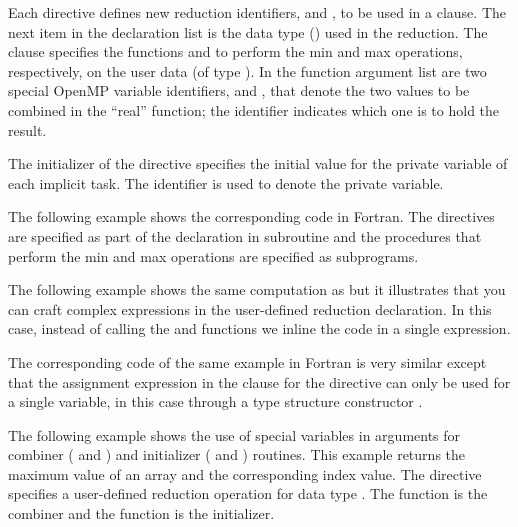 Each  directive defines new reduction identifiers,
 and , to be used in a  clause. The next item in the
declaration list is the data type () used in the
reduction.
The  clause specifies the functions  and
 to perform
the min and max operations, respectively, on the user data (of type ).
In the function argument list are two special OpenMP variable identifiers,  and ,
that denote the two values to be combined in the ``real'' function;
the  identifier indicates which one is to hold the result.

The initializer of the  directive specifies
the initial value for the private variable of each implicit task.
The  identifier is used to denote the private variable.


The following example shows the corresponding code in Fortran. 
The  directives are specified as part of 
the declaration in subroutine  and 
the procedures that perform the min and max operations are specified as subprograms.



The following example shows the same computation as  but it illustrates that you can craft complex expressions in the user-defined 
reduction declaration. In this case, instead of calling the  
and  functions we inline the code in a single expression.


The corresponding code of the same example in Fortran is very similar
except that the assignment expression in the  clause for
the 
directive can only be used for a single variable, in this case through
a type structure constructor .



The following example shows the use of special variables in arguments for 
combiner ( and ) and initializer 
( and ) routines.  This example returns 
the maximum value of an array and the corresponding index value. The 
 directive specifies a user-defined 
reduction operation  for data type . 
The function  is the combiner and the function  
is the initializer.

